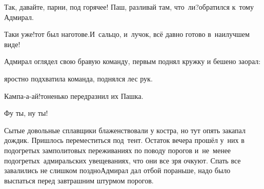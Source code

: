 
\diagdash Так, давайте, парни, под горячее! Паш, разливай там, что~ли?\mdash обратился к~тому Адмирал.

\diagdash Таки уже!\mdash тот был наготове.\mdash И~сальцо, и~лучок, всё давно готово в~наилучшем виде!

Адмирал оглядел свою бравую команду, первым поднял кружку и бешено заорал:


\mdash яростно подхватила команда, поднялся лес рук.

\diagdash Кампа-а-ай!\mdash тоненько передразнил их Пашка.

\diagdash Фу ты, ну ты!


Сытые довольные сплавщики блаженствовали у костра, но тут опять закапал дождик. Пришлось переместиться под~тент.
Остаток вечера прошёл у~них в подогретых замполитовых переживаниях по поводу порогов и~не~менее подогретых~адмиральских увещеваниях, что они все зря очкуют.
Спать все завалились не слишком поздно\mdash Адмирал дал отбой пораньше, надо было выспаться перед завтрашним штурмом порогов.

\begin{center}
\end{center}
